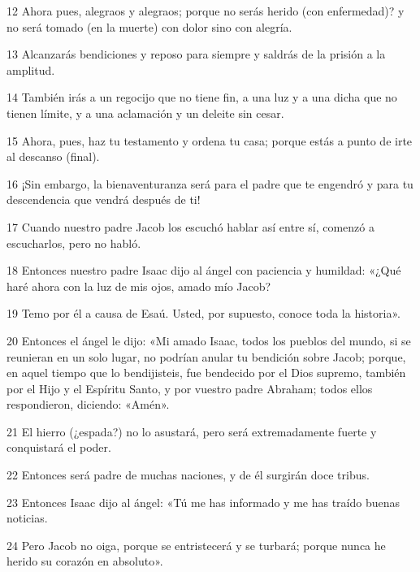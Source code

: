 \par 12 Ahora pues, alegraos y alegraos; porque no serás herido (con enfermedad)? y no será tomado (en la muerte) con dolor sino con alegría.

\par 13 Alcanzarás bendiciones y reposo para siempre y saldrás de la prisión a la amplitud.

\par 14 También irás a un regocijo que no tiene fin, a una luz y a una dicha que no tienen límite, y a una aclamación y un deleite sin cesar.

\par 15 Ahora, pues, haz tu testamento y ordena tu casa; porque estás a punto de irte al descanso (final).

\par 16 ¡Sin embargo, la bienaventuranza será para el padre que te engendró y para tu descendencia que vendrá después de ti!

\par 17 Cuando nuestro padre Jacob los escuchó hablar así entre sí, comenzó a escucharlos, pero no habló.

\par 18 Entonces nuestro padre Isaac dijo al ángel con paciencia y humildad: «¿Qué haré ahora con la luz de mis ojos, amado mío Jacob?

\par 19 Temo por él a causa de Esaú. Usted, por supuesto, conoce toda la historia».

\par 20 Entonces el ángel le dijo: «Mi amado Isaac, todos los pueblos del mundo, si se reunieran en un solo lugar, no podrían anular tu bendición sobre Jacob; porque, en aquel tiempo que lo bendijisteis, fue bendecido por el Dios supremo, también por el Hijo y el Espíritu Santo, y por vuestro padre Abraham; todos ellos respondieron, diciendo: «Amén».

\par 21 El hierro (¿espada?) no lo asustará, pero será extremadamente fuerte y conquistará el poder.

\par 22 Entonces será padre de muchas naciones, y de él surgirán doce tribus.

\par 23 Entonces Isaac dijo al ángel: «Tú me has informado y me has traído buenas noticias.

\par 24 Pero Jacob no oiga, porque se entristecerá y se turbará; porque nunca he herido su corazón en absoluto».

